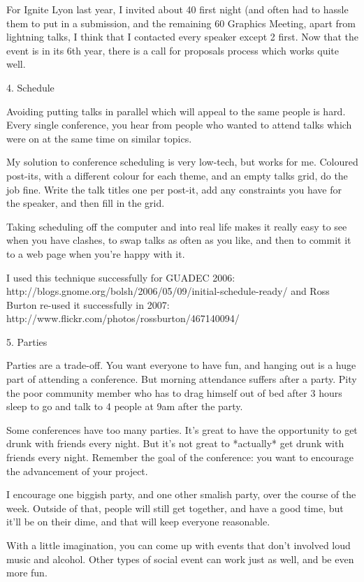 For Ignite Lyon last year, I invited about 40%
first night (and often had to hassle them to put in a submission, and
the remaining 60%
Graphics Meeting, apart from lightning talks, I think that I contacted
every speaker except 2 first. Now that the event is in its 6th year,
there is a call for proposals process which works quite well.

4. Schedule

Avoiding putting talks in parallel which will appeal to the same people
is hard. Every single conference, you hear from people who wanted to
attend talks which were on at the same time on similar topics.

My solution to conference scheduling is very low-tech, but works for me.
Coloured post-its, with a different colour for each theme, and an empty
talks grid, do the job fine. Write the talk titles one per post-it, add
any constraints you have for the speaker, and then fill in the grid.

Taking scheduling off the computer and into real life makes it really
easy to see when you have clashes, to swap talks as often as you like,
and then to commit it to a web page when you're happy with it.

I used this technique successfully for GUADEC 2006:
http://blogs.gnome.org/bolsh/2006/05/09/initial-schedule-ready/ and Ross
Burton re-used it successfully in 2007:
http://www.flickr.com/photos/rossburton/467140094/

5. Parties

Parties are a trade-off. You want everyone to have fun, and hanging out
is a huge part of attending a conference. But morning attendance suffers
after a party. Pity the poor community member who has to drag himself
out of bed after 3 hours sleep to go and talk to 4 people at 9am after
the party.

Some conferences have too many parties. It's great to have the
opportunity to get drunk with friends every night. But it's not great to
*actually* get drunk with friends every night. Remember the goal of the
conference: you want to encourage the advancement of your project.

I encourage one biggish party, and one other smalish party, over the
course of the week. Outside of that, people will still get together, and
have a good time, but it'll be on their dime, and that will keep
everyone reasonable.

With a little imagination, you can come up with events that don't
involved loud music and alcohol. Other types of social event can work
just as well, and be even more fun.

